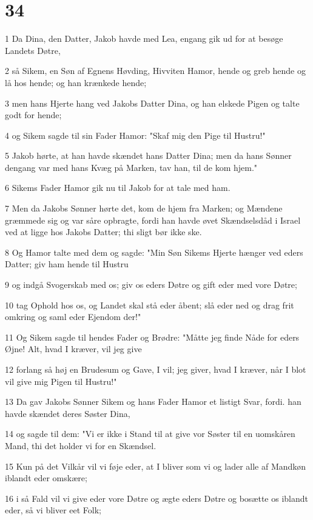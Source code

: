\chapter{34}

\par 1 Da Dina, den Datter, Jakob havde med Lea, engang gik ud for at besøge Landets Døtre,
\par 2 så Sikem, en Søn af Egnens Høvding, Hivviten Hamor, hende og greb hende og lå hos hende; og han krænkede hende;
\par 3 men hans Hjerte hang ved Jakobs Datter Dina, og han elskede Pigen og talte godt for hende;
\par 4 og Sikem sagde til sin Fader Hamor: "Skaf mig den Pige til Hustru!"
\par 5 Jakob hørte, at han havde skændet hans Datter Dina; men da hans Sønner dengang var med hans Kvæg på Marken, tav han, til de kom hjem."
\par 6 Sikems Fader Hamor gik nu til Jakob for at tale med ham.
\par 7 Men da Jakobs Sønner hørte det, kom de hjem fra Marken; og Mændene græmmede sig og var såre opbragte, fordi han havde øvet Skændselsdåd i Israel ved at ligge hos Jakobs Datter; thi sligt bør ikke ske.
\par 8 Og Hamor talte med dem og sagde: "Min Søn Sikems Hjerte hænger ved eders Datter; giv ham hende til Hustru
\par 9 og indgå Svogerskab med os; giv os eders Døtre og gift eder med vore Døtre;
\par 10 tag Ophold hos os, og Landet skal stå eder åbent; slå eder ned og drag frit omkring og saml eder Ejendom der!"
\par 11 Og Sikem sagde til hendes Fader og Brødre: "Måtte jeg finde Nåde for eders Øjne! Alt, hvad I kræver, vil jeg give
\par 12 forlang så høj en Brudesum og Gave, I vil; jeg giver, hvad I kræver, når I blot vil give mig Pigen til Hustru!"
\par 13 Da gav Jakobs Sønner Sikem og hans Fader Hamor et listigt Svar, fordi. han havde skændet deres Søster Dina,
\par 14 og sagde til dem: "Vi er ikke i Stand til at give vor Søster til en uomskåren Mand, thi det holder vi for en Skændsel.
\par 15 Kun på det Vilkår vil vi føje eder, at I bliver som vi og lader alle af Mandkøn iblandt eder omskære;
\par 16 i så Fald vil vi give eder vore Døtre og ægte eders Døtre og bosætte os iblandt eder, så vi bliver eet Folk;
